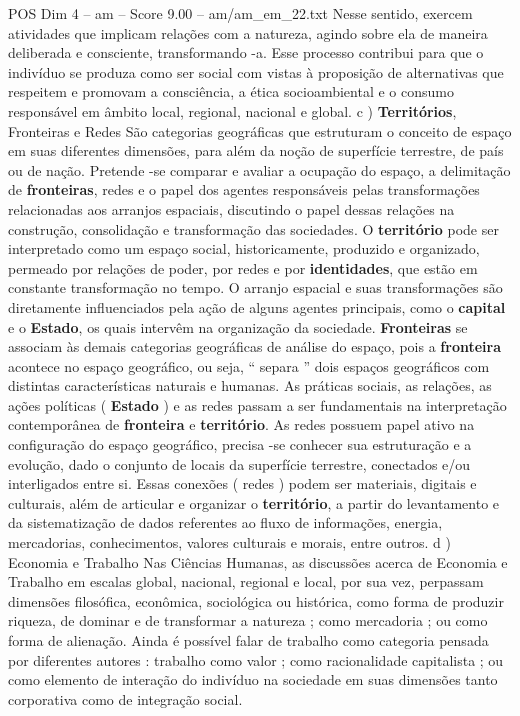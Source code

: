 \begin{textsample}{POS Dim 4 – am – Score 9.00 – am/am\_em\_22.txt}
Nesse sentido, exercem atividades que implicam relações com a natureza, agindo sobre ela de maneira deliberada e consciente, transformando -a.
Esse processo contribui para que o indivíduo se produza como ser social com vistas à proposição de alternativas que respeitem e promovam a consciência, a ética socioambiental e o consumo responsável em âmbito local, regional, nacional e global. c ) \textbf{Territórios}, Fronteiras e Redes São categorias geográficas que estruturam o conceito de espaço em suas diferentes dimensões, para além da noção de superfície terrestre, de país ou de nação.
Pretende -se comparar e avaliar a ocupação do espaço, a delimitação de \textbf{fronteiras}, redes e o papel dos agentes responsáveis pelas transformações relacionadas aos arranjos espaciais, discutindo o papel dessas relações na construção, consolidação e transformação das sociedades.
O \textbf{território} pode ser interpretado como um espaço social, historicamente, produzido e organizado, permeado por relações de poder, por redes e por \textbf{identidades}, que estão em constante transformação no tempo.
O arranjo espacial e suas transformações são diretamente influenciados pela ação de alguns agentes principais, como o \textbf{capital} e o \textbf{Estado}, os quais intervêm na organização da sociedade. \textbf{Fronteiras} se associam às demais categorias geográficas de análise do espaço, pois a \textbf{fronteira} acontece no espaço geográfico, ou seja, “ separa ” dois espaços geográficos com distintas características naturais e humanas.
As práticas sociais, as relações, as ações políticas ( \textbf{Estado} ) e as redes passam a ser fundamentais na interpretação contemporânea de \textbf{fronteira} e \textbf{território}.
As redes possuem papel ativo na configuração do espaço geográfico, precisa -se conhecer sua estruturação e a evolução, dado o conjunto de locais da superfície terrestre, conectados e/ou interligados entre si.
Essas conexões ( redes ) podem ser materiais, digitais e culturais, além de articular e organizar o \textbf{território}, a partir do levantamento e da sistematização de dados referentes ao fluxo de informações, energia, mercadorias, conhecimentos, valores culturais e morais, entre outros. d ) Economia e Trabalho Nas Ciências Humanas, as discussões acerca de Economia e Trabalho em escalas global, nacional, regional e local, por sua vez, perpassam dimensões filosófica, econômica, sociológica ou histórica, como forma de produzir riqueza, de dominar e de transformar a natureza ; como mercadoria ; ou como forma de alienação.
Ainda é possível falar de trabalho como categoria pensada por diferentes autores : trabalho como valor ; como racionalidade capitalista ; ou como elemento de interação do indivíduo na sociedade em suas dimensões tanto corporativa como de integração social.

\end{textsample}
